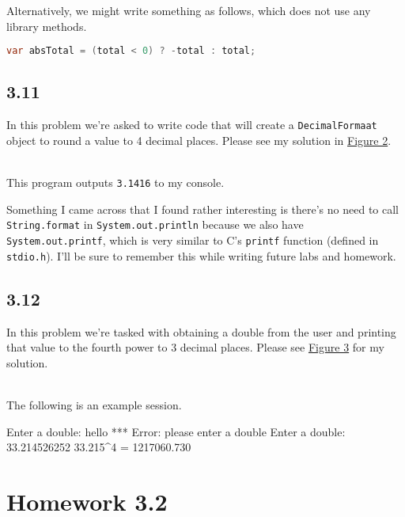 \documentclass[leqno, 11pt]{article}
\newcommand{\iftcodefigure}[3]{%
  \begin{codefigure}
    \label{#1}
    \addtocounter{figure}{-1}
    
  \end{codefigure}
}
\begin{document}
Alternatively, we might write something as follows, which does not use any library methods.
\begin{lstlisting}[language=java, xleftmargin=0.28\textwidth]
var absTotal = (total < 0) ? -total : total;
\end{lstlisting}
\subsection{3.11}
In this problem we're asked to write code that will create a \texttt{DecimalFormaat} object to round a value to 4 decimal places. Please see my solution in \hyperref[fig:two]{Figure 2}.
\iftcodefigure{fig:two}{Formatter.java}{%
  /home/brandon/eclipse-workspace/ift_194_hw/src/hw_3/Formatter.java}\\
This program outputs \texttt{3.1416} to my console.

Something I came across that I found rather interesting is there's no need to call \texttt{String.format} in \texttt{System.out.println} because we also have \texttt{System.out.printf}, which is very similar to C's \texttt{printf} function (defined in \texttt{stdio.h}). I'll be sure to remember this while writing future labs and homework.
\subsection{3.12}
In this problem we're tasked with obtaining a double from the user and printing that value to the fourth power to 3 decimal places. Please see \hyperref[fig:three]{Figure 3} for my solution.
\iftcodefigure{fig:three}{GetOutput.java}{%
  /home/brandon/eclipse-workspace/ift_194_hw/src/hw_3/GetOutput.java}\\
The following is an example session.
\begin{verbbox}[\mbox{}\scriptsize]
Enter a double: hello
*** Error: please enter a double
Enter a double: 33.214526252
33.215^4 = 1217060.730
\end{verbbox}
\begin{center}
  \theverbbox
\end{center}
\section{Homework 3.2}
\end{document}

